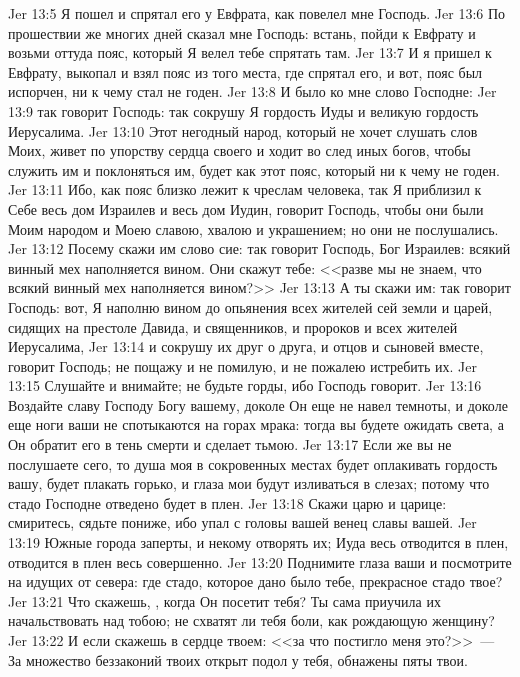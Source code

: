 \vs Jer 13:5 Я пошел и спрятал его у Евфрата, как повелел мне Господь.
\vs Jer 13:6 По прошествии же многих дней сказал мне Господь: встань, пойди к Евфрату и возьми оттуда пояс, который Я велел тебе спрятать там.
\vs Jer 13:7 И я пришел к Евфрату, выкопал и взял пояс из того места, где спрятал его, и вот, пояс был испорчен, ни к чему стал не годен.
\rsbpar\vs Jer 13:8 И было ко мне слово Господне:
\vs Jer 13:9 так говорит Господь: так сокрушу Я гордость Иуды и великую гордость Иерусалима.
\vs Jer 13:10 Этот негодный народ, который не хочет слушать слов Моих, живет по упорству сердца своего и ходит во след иных богов, чтобы служить им и поклоняться им, будет как этот пояс, который ни к чему не годен.
\vs Jer 13:11 Ибо, как пояс близко лежит к чреслам человека, так Я приблизил к Себе весь дом Израилев и весь дом Иудин, говорит Господь, чтобы они были Моим народом и Моею славою, хвалою и украшением; но они не послушались.
\vs Jer 13:12 Посему скажи им слово сие: так говорит Господь, Бог Израилев: всякий винный мех наполняется вином. Они скажут тебе: <<разве мы не знаем, что всякий винный мех наполняется вином?>>
\vs Jer 13:13 А ты скажи им: так говорит Господь: вот, Я наполню вином до опьянения всех жителей сей земли и царей, сидящих на престоле Давида, и священников, и пророков и всех жителей Иерусалима,
\vs Jer 13:14 и сокрушу их друг о друга, и отцов и сыновей вместе, говорит Господь; не пощажу и не помилую, и не пожалею истребить их.
\vs Jer 13:15 Слушайте и внимайте; не будьте горды, ибо Господь говорит.
\vs Jer 13:16 Воздайте славу Господу Богу вашему, доколе Он еще не навел темноты, и доколе еще ноги ваши не спотыкаются на горах мрака: тогда вы будете ожидать света, а Он обратит его в тень смерти и сделает тьмою.
\vs Jer 13:17 Если же вы не послушаете сего, то душа моя в сокровенных местах будет оплакивать гордость вашу, будет плакать горько, и глаза мои будут изливаться в слезах; потому что стадо Господне отведено будет в плен.
\vs Jer 13:18 Скажи царю и царице: смиритесь, сядьте пониже, ибо упал с головы вашей венец славы вашей.
\vs Jer 13:19 Южные города заперты, и некому отворять их; Иуда весь отводится в плен, отводится в плен весь совершенно.
\vs Jer 13:20 Поднимите глаза ваши и посмотрите на идущих от севера: где стадо, которое дано было тебе, прекрасное стадо твое?
\vs Jer 13:21 Что скажешь, , когда Он посетит тебя? Ты сама приучила их начальствовать над тобою; не схватят ли тебя боли, как рождающую женщину?
\vs Jer 13:22 И если скажешь в сердце твоем: <<за что постигло меня это?>>~--- За множество беззаконий твоих открыт подол у тебя, обнажены пяты твои.
